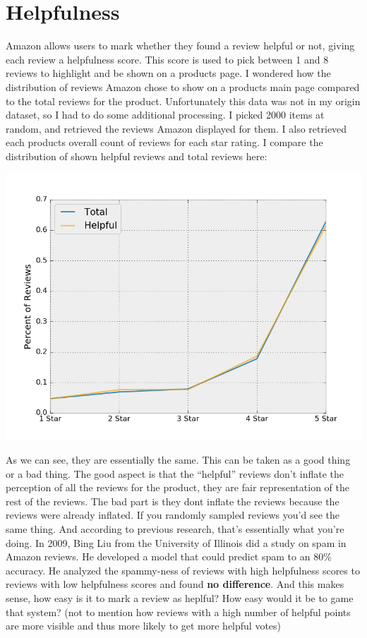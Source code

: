 \documentclass[a4paper,11pt]{article}
\begin{document}
\section*{Helpfulness}
Amazon allows users to mark whether they found a review helpful or not, giving each review a helpfulness score. This score is used to pick between 1 and 8 reviews to highlight and be shown on a products page. I wondered how the distribution of reviews Amazon chose to show on a products main page compared to the total reviews for the product. Unfortunately this data was not in my origin dataset, so I had to do some additional processing. I picked 2000 items at random, and retrieved the reviews Amazon displayed for them. I also retrieved each products overall count of reviews for each star rating. I compare the distribution of shown helpful reviews and total reviews here:
\begin{center}
    \includegraphics[scale=0.5]{helpfulness.png}
\end{center}
As we can see, they are essentially the same. This can be taken as a good thing or a bad thing. The good aspect is that the \enquote{helpful} reviews don't inflate the perception of all the reviews for the product, they are fair representation of the rest of the reviews. The bad part is they dont inflate the reviews because the reviews were already inflated. If you randomly sampled reviews you'd see the same thing. And according to previous research, that's essentially what you're doing. In 2009, Bing Liu from the University of Illinois did a study on spam in Amazon reviews. He developed a model that could predict spam to an 80\% accuracy. He analyzed the spammy-ness of reviews with high helpfulness scores to reviews with low helpfulness scores and found \textbf{no difference}. And this makes sense, how easy is it to mark a review as heplful? How easy would it be to game that system? (not to mention how reviews with a high number of helpful points are more visible and thus more likely to get more helpful votes)
\end{document}
